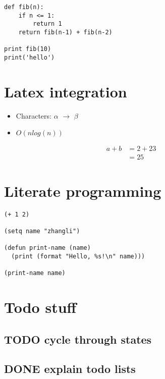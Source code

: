 \documentclass[11pt]{article}
\begin{document}
\begin{verbatim}
def fib(n):
    if n <= 1:
        return 1
    return fib(n-1) + fib(n-2)

print fib(10)
print('hello')
\end{verbatim}


\section{Latex integration}
\label{sec:orgheadline8}

\begin{itemize}
\item Characters: \(\alpha\) \(\rightarrow\) \(\beta\)
\item \(O(n log(n))\)
\end{itemize}

\begin{align*}
a + b &= 2 + 23 \\
      &= 25
\end{align*}

\section{Literate programming}
\label{sec:orgheadline9}

\begin{verbatim}
(+ 1 2)

(setq name "zhangli")

(defun print-name (name)
  (print (format "Hello, %s!\n" name)))

(print-name name)
\end{verbatim}

\section{Todo stuff}
\label{sec:orgheadline12}
\subsection{{\bfseries\sffamily TODO} cycle through states}
\label{sec:orgheadline10}
\subsection{{\bfseries\sffamily DONE} explain todo lists}
\label{sec:orgheadline11}
\end{document}
